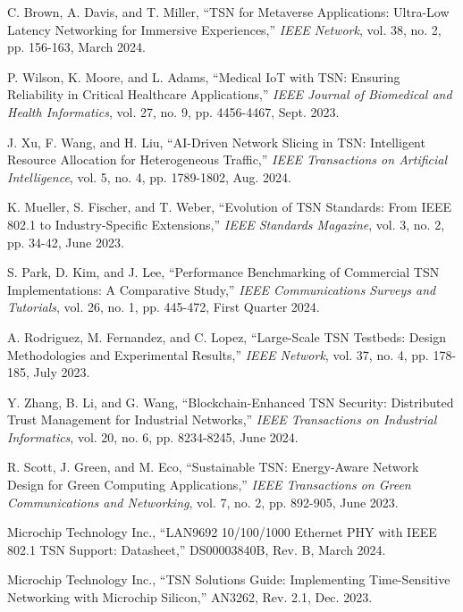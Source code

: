 \documentclass[10pt, journal, compsoc]{IEEEtran}
\begin{document}
\begin{thebibliography}{99}
C. Brown, A. Davis, and T. Miller, ``TSN for Metaverse Applications: Ultra-Low Latency Networking for Immersive Experiences,'' \textit{IEEE Network}, vol. 38, no. 2, pp. 156-163, March 2024.

P. Wilson, K. Moore, and L. Adams, ``Medical IoT with TSN: Ensuring Reliability in Critical Healthcare Applications,'' \textit{IEEE Journal of Biomedical and Health Informatics}, vol. 27, no. 9, pp. 4456-4467, Sept. 2023.

J. Xu, F. Wang, and H. Liu, ``AI-Driven Network Slicing in TSN: Intelligent Resource Allocation for Heterogeneous Traffic,'' \textit{IEEE Transactions on Artificial Intelligence}, vol. 5, no. 4, pp. 1789-1802, Aug. 2024.

K. Mueller, S. Fischer, and T. Weber, ``Evolution of TSN Standards: From IEEE 802.1 to Industry-Specific Extensions,'' \textit{IEEE Standards Magazine}, vol. 3, no. 2, pp. 34-42, June 2023.

S. Park, D. Kim, and J. Lee, ``Performance Benchmarking of Commercial TSN Implementations: A Comparative Study,'' \textit{IEEE Communications Surveys and Tutorials}, vol. 26, no. 1, pp. 445-472, First Quarter 2024.

A. Rodriguez, M. Fernandez, and C. Lopez, ``Large-Scale TSN Testbeds: Design Methodologies and Experimental Results,'' \textit{IEEE Network}, vol. 37, no. 4, pp. 178-185, July 2023.

Y. Zhang, B. Li, and G. Wang, ``Blockchain-Enhanced TSN Security: Distributed Trust Management for Industrial Networks,'' \textit{IEEE Transactions on Industrial Informatics}, vol. 20, no. 6, pp. 8234-8245, June 2024.

R. Scott, J. Green, and M. Eco, ``Sustainable TSN: Energy-Aware Network Design for Green Computing Applications,'' \textit{IEEE Transactions on Green Communications and Networking}, vol. 7, no. 2, pp. 892-905, June 2023.

Microchip Technology Inc., ``LAN9692 10/100/1000 Ethernet PHY with IEEE 802.1 TSN Support: Datasheet,'' DS00003840B, Rev. B, March 2024.

Microchip Technology Inc., ``TSN Solutions Guide: Implementing Time-Sensitive Networking with Microchip Silicon,'' AN3262, Rev. 2.1, Dec. 2023.


\end{thebibliography}
\end{document}
